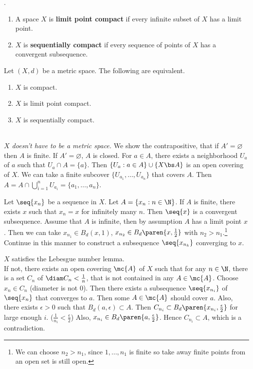 .
\begin{enumerate}
    \item {} A space \(X\) is \textbf{limit point compact} if every infinite subset of \(X\) has a limit point.

    \item {} \(X\) is \textbf{sequentially compact} if every sequence of points of \(X\) has a convergent subsequence.
\end{enumerate}

 Let \((X, d)\) be a metric space. The following are equivalent.
\begin{enumerate}
    \item \(X\) is compact.
    \item \(X\) is limit point compact.
    \item \(X\) is sequentially compact.
\end{enumerate}

\pf \\
  \textit{\(X\) doesn't have to be a metric space.} We show the contrapositive, that if \(A' = \varnothing\) then \(A\) is finite. If \(A' = \varnothing\), \(A\) is closed. For \(a \in A\), there exists a neighborhood \(U_a\) of \(a\) such that \(U_a \cap A = \{a\}\). Then \(\{U_a : a \in A\} \cup \{X \bs A\}\) is an open covering of \(X\). We can take a finite subcover \(\{U_{a_1}, \dots, U_{a_n}\}\) that covers \(A\). Then \(A = A \cap \bigcup_{i=1}^n U_{a_i} = \{a_1, \dots, a_n\}\).

 Let \(\seq{x_n}\) be a sequence in \(X\). Let \(A = \{x_n : n \in \N\}\). If \(A\) is finite, there exists \(x\) such that \(x_n = x\) for infinitely many \(n\). Then \(\seq{x}\) is a convergent subsequence. Assume that \(A\) is infinite, then by assumption \(A\) has a limit point \(x\). Then we can take \(x_{n_1} \in B_d(x, 1)\), \(x_{n_2} \in B_d\paren{x, \frac{1}{2}}\) with \(n_2 > n_1\).\footnote{We can choose \(n_2 > n_1\), since \(1, \dots, n_1\) is finite so take away finite points from an open set is still open.} Continue in this manner to construct a subsequence \(\seq{x_{n_k}}\) converging to \(x\).

  \(X\) satisfies the Lebesgue number lemma. \\
If not, there exists an open covering \(\mc{A}\) of \(X\) such that for any \(n \in \N\), there is a set \(C_n\) of \(\diam C_n < \frac{1}{n}\), that is not contained in any \(A \in \mc{A}\). Choose \(x_n \in C_n\) (diameter is not 0). Then there exists a subsequence \(\seq{x_{n_i}}\) of \(\seq{x_n}\) that converges to \(a\). Then some \(A \in \mc{A}\) should cover \(a\). Also, there exists \(\epsilon > 0\) such that \(B_d(a, \epsilon) \subset A\). Then \(C_{n_i} \subset B_d\paren{x_{n_i}, \frac{\epsilon}{2}}\) for large enough \(i\). (\(\frac{1}{n_i} < \frac{\epsilon}{2}\)) Also, \(x_{n_i} \in B_d\paren{a, \frac{\epsilon}{2}}\). Hence \(C_{n_i} \subset A\), which is a contradiction.

